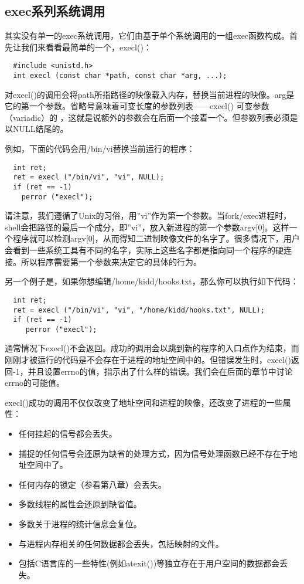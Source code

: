 \subsection{exec系列系统调用}

其实没有单一的exec系统调用，它们由基于单个系统调用的一组exec函数构成。首先让我们来看看最简单的一个，execl()：

\begin{lstlisting}
  #include <unistd.h>
  int execl (const char *path, const char *arg, ...);
\end{lstlisting}

对execl()的调用会将path所指路径的映像载入内存，替换当前进程的映像。arg是它的第一个参数。省略号意味着可变长度的参数列表——execl() 可变参数（variadic）的 ，这就是说额外的参数会在后面一个接着一个。但参数列表必须是以NULL结尾的。

例如，下面的代码会用/bin/vi替换当前运行的程序：

\begin{lstlisting}
  int ret;
  ret = execl ("/bin/vi", "vi", NULL);
  if (ret == -1)
    perror ("execl");
\end{lstlisting}

请注意，我们遵循了Unix的习俗，用''vi''作为第一个参数。当fork/exec进程时，shell会把路径的最后一个成分，即''vi''，放入新进程的第一个参数argv[0]。这样一个程序就可以检测argv[0]，从而得知二进制映像文件的名字了。很多情况下，用户会看到一些系统工具有不同的名字，实际上这些名字都是指向同一个程序的硬连接。所以程序需要第一个参数来决定它的具体的行为。

另一个例子是，如果你想编辑/home/kidd/hooks.txt，那么你可以执行如下代码：

\begin{lstlisting}
  int ret;
  ret = execl ("/bin/vi", "vi", "/home/kidd/hooks.txt", NULL);
  if (ret == -1)
     perror ("execl");
\end{lstlisting}

通常情况下execl()不会返回。成功的调用会以跳到新的程序的入口点作为结束，而刚刚才被运行的代码是不会存在于进程的地址空间中的。但错误发生时，execl()返回-1，并且设置errno的值，指示出了什么样的错误。我们会在后面的章节中讨论errno的可能值。

execl()成功的调用不仅仅改变了地址空间和进程的映像，还改变了进程的一些属性：

\begin{itemize}
\item 任何挂起的信号都会丢失。
\item 捕捉的任何信号会还原为缺省的处理方式，因为信号处理函数已经不存在于地址空间中了。
\item 任何内存的锁定（参看第八章）会丢失。
\item 多数线程的属性会还原到缺省值。
\item 多数关于进程的统计信息会复位。
\item 与进程内存相关的任何数据都会丢失，包括映射的文件。
\item 包括C语言库的一些特性(例如atexit())等独立存在于用户空间的数据都会丢失。
\end{itemize}

